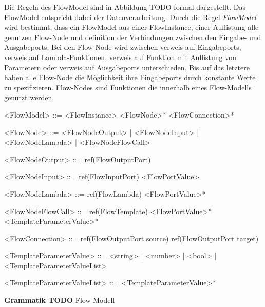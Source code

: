 \documentclass{article}
\begin{document}
    Die Regeln des FlowModel sind in Abbildung TODO formal dargestellt. Das FlowModel entspricht dabei der Datenverarbeitung. \cite{99}
    Durch die Regel \textit{FlowModel} wird bestimmt, dass ein FlowModel aus einer FlowInstance, einer Auflistung alle genutzen Flow-Node und definition der Verbindungen zwischen den Eingabe- und Ausgabeports.
    Bei den Flow-Node wird zwischen verweis auf Eingabeports, verweis auf Lambda-Funktionen, verweis auf Funktion mit Auflistung von Parametern oder verweis auf Ausgabeports unterschieden.
    Bis auf das letztere haben alle Flow-Node die Möglichkeit ihre Eingabeports durch konstante Werte zu spezifizieren.
    Flow-Nodes sind Funktionen die innerhalb eines Flow-Modells genutzt werden.\\
    \begin{grammar}
        <FlowModel> ::= <FlowInstance> <FlowNode>* <FlowConnection>*

        <FlowNode> ::= <FlowNodeOutput> | <FlowNodeInput> | <FlowNodeLambda> | <FlowNodeFlowCall>
       
        <FlowNodeOutput> ::= ref(FlowOutputPort)

        <FlowNodeInput> ::= ref(FlowInputPort) <FlowPortValue>

        <FlowNodeLambda> ::= ref(FlowLambda) <FlowPortValue>*

        <FlowNodeFlowCall> ::= ref(FlowTemplate) <FlowPortValue>* <TemplateParameterValue>*
    
        <FlowConnection> ::= ref(FlowOutputPort source) ref(FlowOutputPort target)
    
        <TemplateParameterValue> ::= <string> | <number> | <bool> | <TemplateParameterValueList>
    
        <TemplateParameterValueList> ::= <TemplateParameterValue>*
    \end{grammar}
    \textbf{Grammatik TODO} Flow-Modell
\end{document}

